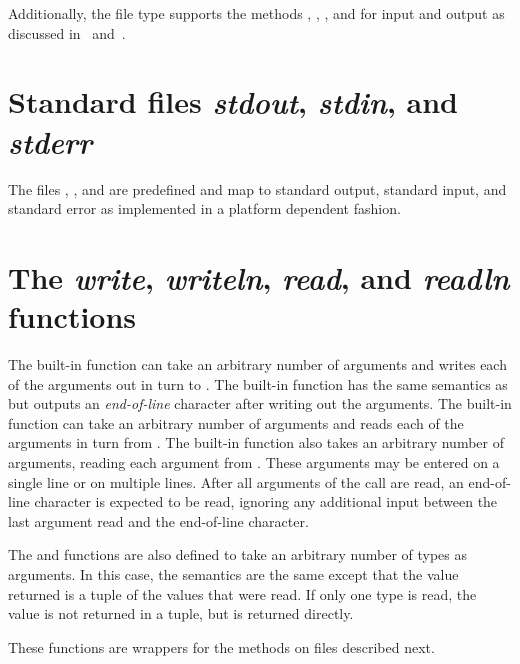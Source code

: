 Additionally, the file type supports the
methods , , , and  for 
input and output as discussed in~ and~.

\section{Standard files {\em stdout}, {\em stdin}, and {\em stderr}}

The files , , and  are
predefined and map to standard output, standard input, and standard
error as implemented in a platform dependent fashion.

\section{The {\em write}, {\em writeln}, {\em read}, and {\em readln} 
functions}

The built-in function  can take an arbitrary number of
arguments and writes each of the arguments out in turn
to .  The built-in function  has the same
semantics as  but outputs an {\em end-of-line} character
after writing out the arguments.  The built-in function 
can take an arbitrary number of arguments and reads each of the
arguments in turn from .  The built-in function 
also takes an arbitrary number of arguments, reading each argument from
.  These arguments may be entered on a single line or on multiple
lines.  After all arguments of the  call are read, an 
end-of-line character is expected to be read, ignoring any additional 
input between the last argument read and the end-of-line character.

The  and  functions are also defined to take
an arbitrary number of types as arguments.  In this case, the
semantics are the same except that the value returned is a tuple of
the values that were read.  If only one type is read, the value is not
returned in a tuple, but is returned directly.

These functions are wrappers for the methods on files described next.

